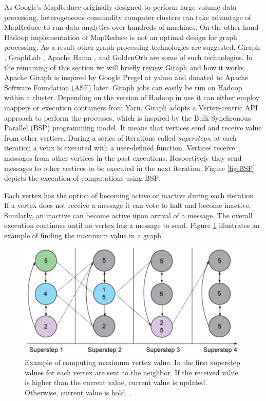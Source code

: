 \documentclass[runningheads,a4paper]{llncs}
\begin{document}
{As Google's MapReduce originally designed to perform large volume data processing, heterogeneous commodity computer clusters can take advantage of MapReduce to run data analytics over hundreds of machines. On the other hand Hadoop implementation of MapReduce is not an optimal design for graph processing. As a result other graph processing technologies are suggested. Giraph \cite{avery2011giraph}, GraphLab \cite{low2014graphlab}, Apache Hama \cite{seo2010hama}, and GoldenOrb  are some of such technologies. In the remaining of this section we will briefly review Giraph and how it works.\\

Apache Giraph is inspired by Google Pregel \cite{malewicz2010pregel} at yahoo and donated to Apache Software Foundation (ASF) later. Giraph jobs can easily be run on Hadoop within a cluster. Depending on the version of Hadoop in use it can either employ mappers or execution containers from Yarn. Giraph adopts a Vertex-centric API approach to perform the processes, which is inspired by the Bulk Synchronous Parallel (BSP) programming model. It means that vertices send and receive value from other vertices. During a series of iterations called \textit{supersteps}, at each iteration a vetix is executed with a user-defined function. Vertices receive messages from other vertices in the past executions. Respectively they send messages to other vertices to be executed in the next iteration. Figure \ref{fig:BSP} depicts the execution of computations using BSP.

Each vertex has the option of becoming active or inactive during each iteration. If a vertex does not receive a message it can vote to halt and become inactive. Similarly, an inactive can become active upon arrival of a message. The overall execution continues until no vertex has a message to send. Figure \ref{fig:max_super} illustrates an example of finding the maximum value in a graph.
\begin{figure}[!ht]
	\includegraphics[scale=0.38]{./images/max_superstep.png}
	\centering
	\caption{Example of computing maximum vertex value. In the first superstep values for each vertex are sent to the neighbor. If the received value is higher than the current value, current value is updated. Otherwise, current value is hold.  \cite{sakr2013processing}.}
	\label{fig:max_super}
\end{figure}

}
\end{document}
